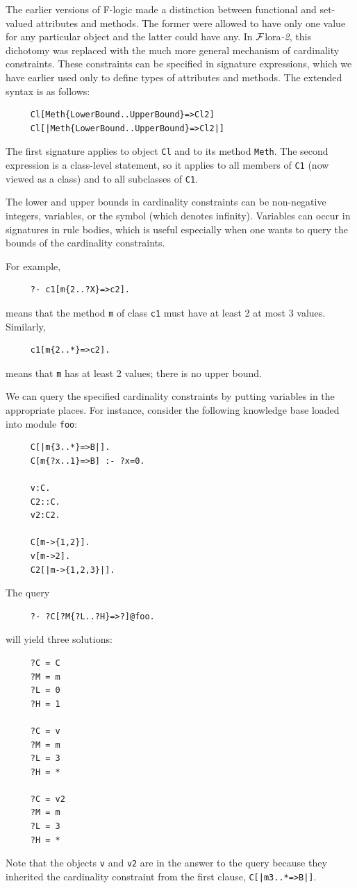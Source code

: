 \documentclass[11pt]{article}
\newcommand{\FLSYSTEM}{{\mbox{\sc ${\cal F}${lora}\rm\emph{-2}}}\xspace}
\begin{document}
The earlier versions of F-logic made a distinction between functional and
set-valued attributes and methods. The former were allowed to have only one
value for any particular object and the latter could have any. In \FLSYSTEM,
this dichotomy was replaced with the much more general mechanism of
cardinality constraints. These constraints can be specified in signature
expressions, which we have earlier used only to define types of attributes
and methods. The extended syntax is as follows:
\begin{verbatim}
     Cl[Meth{LowerBound..UpperBound}=>Cl2]
     Cl[|Meth{LowerBound..UpperBound}=>Cl2|]
\end{verbatim}
The first signature applies to object {\tt Cl} and to its 
method {\tt Meth}. The second expression is a class-level statement, so it
applies to all members of \texttt{C1} (now viewed as a class) and to all
subclasses of \texttt{C1}.  

The lower and upper bounds in cardinality constraints can be non-negative
integers, variables, or the symbol {\tt *} (which denotes
infinity). Variables can occur in signatures in rule bodies, which is
useful especially when one wants to query the bounds of the cardinality
constraints.

For example,
\begin{verbatim}
     ?- c1[m{2..?X}=>c2].
\end{verbatim}
means that the method {\tt m}  of class {\tt c1} must have at least 2 at
most 3 values. Similarly,
\begin{verbatim}
     c1[m{2..*}=>c2]. 
\end{verbatim}
means that {\tt m}  has at least 2 values; there is no upper bound.

We can query the specified cardinality constraints by putting variables in
the appropriate places. For instance, consider the following knowledge base
loaded into module {\tt foo}: 
\begin{verbatim}
     C[|m{3..*}=>B|].
     C[m{?x..1}=>B] :- ?x=0.

     v:C.
     C2::C.
     v2:C2.
   
     C[m->{1,2}].
     v[m->2].
     C2[|m->{1,2,3}|].
\end{verbatim}
The query
\begin{verbatim}
     ?- ?C[?M{?L..?H}=>?]@foo. 
\end{verbatim}
will yield three solutions:
\begin{verbatim}
     ?C = C 
     ?M = m
     ?L = 0
     ?H = 1

     ?C = v
     ?M = m
     ?L = 3
     ?H = *

     ?C = v2
     ?M = m
     ?L = 3
     ?H = *
\end{verbatim}
Note that the objects {\tt v} and {\tt v2} are in the answer to the query
because they inherited the cardinality constraint
from the first clause, {\tt C[|m{3..*}=>B|]}.
\end{document}
